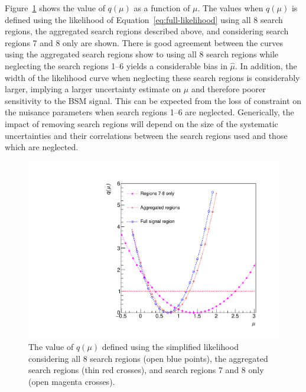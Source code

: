 Figure~\ref{fig:agg-likelihoodscan} shows the value of $q(\mu)$ as a function of $\mu$. The values when $q(\mu)$ 
is defined using the likelihood of Equation~\ref{eq:full-likelihood} using all 8 search regions, the aggregated search 
regions described above, and considering search regions 7 and 8 only are shown. There is good agreement between the curves using the 
aggregated search regions show to using all 8 search regions while neglecting the search regions 1--6 yields a considerable
bias in $\hat{\mu}$. In addition, the width of the likelihood curve when neglecting these search regions is considerably
larger, implying a larger uncertainty estimate on $\mu$ and therefore poorer sensitivity to the BSM signal. 
This can be expected from the loss of constraint on the nuisance parameters when search regions 1--6 are neglected. 
Generically, the impact of removing search regions will depend on the size of the systematic uncertainties and their correlations 
between the search regions used and those which are neglected.

\begin{figure}[hbt]
  \begin{center} 
   \includegraphics[width=1.5\cmsFigWidth]{figures/r_agg.pdf}
   \caption{The value of $q(\mu)$ defined using the simplified likelihood considering all 8 search regions (open blue points), the aggregated search regions (thin red crosses),
   and search regions 7 and 8 only (open magenta crosses).}
   \label{fig:agg-likelihoodscan} 
  \end{center}
\end{figure}
